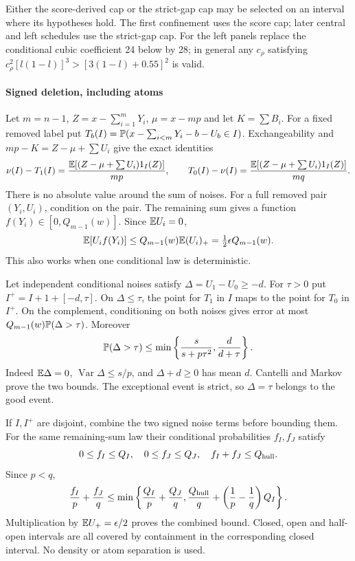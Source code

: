 Either the score-derived cap or the strict-gap cap may be selected on
an interval where its hypotheses hold. The first confinement uses the
score cap; later central and left schedules use the strict-gap cap.
For the left panels replace the conditional cubic coefficient 24 below
by 28; in general any $c_\rho$ satisfying
$c_\rho^2[l(1-l)]^3>[3(1-l)+0.55]^2$ is valid.
\paragraph{Signed deletion, including atoms}
Let $m=n-1$, $Z=x-\sum_{i=1}^mY_i$, $\mu=x-mp$ and let $K=\sum B_i$.
For a fixed removed label put
$T_b(I)=\mathbb P(x-\sum_{i<m}Y_i-b-U_b\in I)$.
Exchangeability and $mp-K=Z-\mu+\sum U_i$ give the exact identities
\[
 \nu(I)-T_1(I)=\frac{\mathbb E[(Z-\mu+\sum U_i)1_I(Z)]}{mp},\qquad
 T_0(I)-\nu(I)=\frac{\mathbb E[(Z-\mu+\sum U_i)1_I(Z)]}{mq}.
\]
There is no absolute value around the sum of noises.
For a full removed pair $(Y_i,U_i)$, condition on the pair. The remaining
sum gives a function $f(Y_i)\in[0,Q_{m-1}(w)]$. Since $\mathbb E U_i=0$,
\[
 \mathbb E[U_i f(Y_i)]\le Q_{m-1}(w)\mathbb E(U_i)_+
 =\tfrac12\epsilon Q_{m-1}(w).
\]
This also works when one conditional law is deterministic.

Let independent conditional noises satisfy $\Delta=U_1-U_0\ge-d$.
For $\tau>0$ put $I^+=I+1+[-d,\tau]$. On $\Delta\le\tau$, the
point for $T_1$ in $I$ maps to the point for $T_0$ in $I^+$. On the
complement, conditioning on both noises gives error at most
$Q_{m-1}(w)\mathbb P(\Delta>\tau)$. Moreover
\begin{equation}\label{ms:fourier:cut49:conf:bad}
 \mathbb P(\Delta>\tau)\le
 \min\left\{\frac{s}{s+p\tau^2},\frac d{d+\tau}\right\}.
\end{equation}
Indeed $\mathbb E\Delta=0$, $\operatorname{Var}\Delta\le s/p$, and
$\Delta+d\ge0$ has mean $d$. Cantelli and Markov prove the two bounds.
The exceptional event is strict, so $\Delta=\tau$ belongs to the good event.

If $I,I^+$ are disjoint, combine the two signed noise terms before
bounding them. For the same remaining-sum law their conditional
probabilities $f_I,f_J$ satisfy
\[
 0\le f_I\le Q_I,\quad0\le f_J\le Q_J,\quad f_I+f_J\le Q_{\rm hull}.
\]
Since $p<q$,
\[
 \frac{f_I}{p}+\frac{f_J}{q}
 \le\min\left\{\frac{Q_I}p+\frac{Q_J}q,
 \frac{Q_{\rm hull}}q+\left(\frac1p-\frac1q\right)Q_I\right\}.
\]
Multiplication by $\mathbb E U_+=\epsilon/2$ proves the combined bound.
Closed, open and half-open intervals are all covered by containment in
the corresponding closed interval. No density or atom separation is used.

